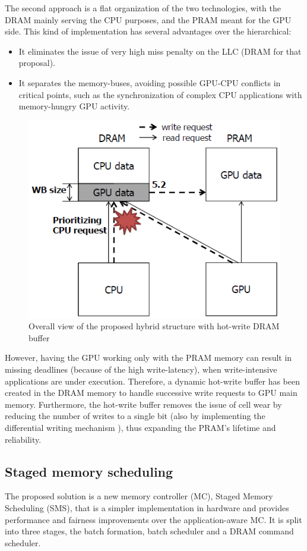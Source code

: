 \documentclass[12pt,journal,compsoc]{IEEEtran}
\begin{document}
The second approach is a flat organization of the two technologies, with the DRAM mainly serving the CPU purposes, and the PRAM meant for the GPU side. This kind of implementation has several advantages over the hierarchical:
\begin{itemize}
\item{It eliminates the issue of very high miss penalty on the LLC (DRAM for that proposal).}
\item{It separates the memory-buses, avoiding possible GPU-CPU conflicts in critical points, such as the synchronization of complex CPU applications with memory-hungry GPU activity.}
\end{itemize}
\begin{figure}[H]
	\centering
	\includegraphics[width = 8 cm]{graphics/StructureWithBuffer.PNG}
	\caption{Overall view of the proposed hybrid structure with hot-write DRAM buffer}\label{fig:structurebuff}
\end{figure} 
However, having the GPU working only with the PRAM memory can result in missing deadlines (because of the high write-latency), when write-intensive applications are under execution. Therefore, a dynamic hot-write buffer has been created in the DRAM memory to handle successive write requests to GPU main memory. Furthermore, the hot-write buffer removes the issue of cell wear by reducing the number of writes to a single bit (also by implementing the differential writing mechanism \cite{PRAM}), thus expanding the PRAM's lifetime and reliability.

\subsection{Staged memory scheduling}
The proposed solution is a new memory controller (MC), Staged Memory Scheduling (SMS),  that is a simpler implementation in hardware and provides performance and fairness improvements over the application-aware MC.  It is split into three stages, the batch formation, batch scheduler and a DRAM command scheduler.
\end{document}
